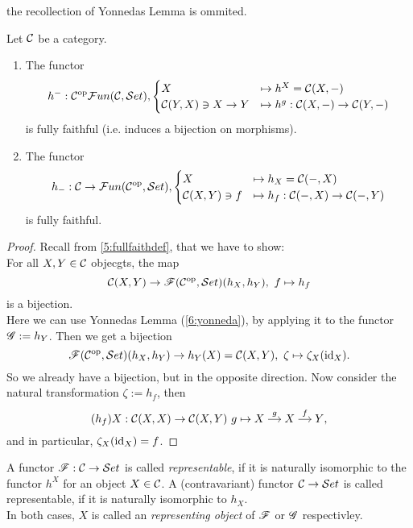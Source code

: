 \coms the recollection of Yonnedas Lemma is ommited.\come
\begin{thm}
  Let $\mathcal{C}$ be a category.
  \begin{enumerate}
  \item The functor 
  \[
  h^{\mathrm{-}}:\mathcal{C}^{\mathrm{op}}\mathcal{F}un(\mathcal{C},\mathcal{S}et),\begin{cases}X&\mapsto h^X=\mathcal{C}(X,-)\\
  \mathcal{C}(Y,X)\ni X\to Y&\mapsto h^g:\mathcal{C}(X,-)\to \mathcal{C}(Y,-)\end{cases}
  \]
  is fully faithful (\coms i.e. induces a bijection on morphisms\come).
  \item The functor
  \[
  h_{\mathrm{-}}:\mathcal{C}\to \mathcal{F}un(\mathcal{C}^{\mathrm{op}},\mathcal{S}et), \begin{cases}X&\mapsto h_X=\mathcal{C}(-,X)\\
  \mathcal{C}(X,Y)\ni f&\mapsto h_f:\mathcal{C}(-,X)\to \mathcal{C}(-,Y)
  \end{cases}
  \]
  is fully faithful.
  \end{enumerate}
\end{thm}

\begin{proof}
    Recall from \cref{5:fullfaithdef}, that we have to show:\\
    For all $X,Y\in \mathcal{C}$ objecgts, the map 
    \[
    \mathcal{C}(X,Y)\to \mathscr{F}(\mathcal{C}^{\mathrm{op}},\mathcal{S}et)(h_X,h_Y),~f\mapsto h_f
    \]
    is a bijection.\\
    Here we can use Yonnedas Lemma (\cref{6:yonneda}), by applying it to the functor $\mathscr{G}:= h_Y$. Then we get a bijection
    \[
    \mathscr{F}(\mathcal{C}^{\mathrm{op}},\mathcal{S}et)(h_X,h_Y) \to h_Y(X) = \mathcal{C}(X,Y),~ \zeta \mapsto \zeta_X(\operatorname{id}_X).
    \]
    So we already have a bijection, but in the opposite direction. Now consider the natural transformation $\zeta:=h_f$, then 
    \[
    (h_f)X: \ccat(X,X)\to \ccat(X,Y)~g\mapsto \begin{tikzcd}[cramped, sep=small] X\ar{r}{g}&X\ar{r}{f}&Y\end{tikzcd},
    \]
    and in particular, $\zeta_X(\operatorname{id}_X)=f$.
 \end{proof}

\begin{defn}
    A functor $\mathscr{F}:\mathcal{C}\to\mathcal{S}et$ is called \emph{representable}, if it is naturally isomorphic to the functor $h^X$ for an object $X\in \mathcal{C}$. A (contravariant) functor $\mathcal{C}\to \mathcal{S}et$ is called representable, if it is naturally isomorphic to $h_X$.\\
    In both cases, $X$ is called an \emph{representing object}  of $\mathscr{F}$ or $\mathscr{G}$ respectivley.
\end{defn}

